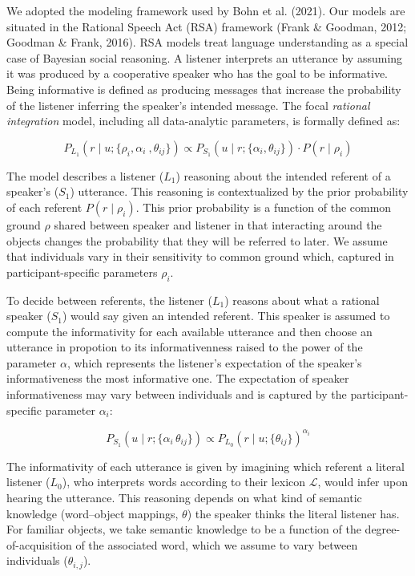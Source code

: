 \documentclass[
  man,mask,floatsintext]{apa6}
\begin{document}
We adopted the modeling framework used by Bohn et al. (2021). Our models are situated in the Rational Speech Act (RSA) framework (Frank \& Goodman, 2012; Goodman \& Frank, 2016). RSA models treat language understanding as a special case of Bayesian social reasoning. A listener interprets an utterance by assuming it was produced by a cooperative speaker who has the goal to be informative. Being informative is defined as producing messages that increase the probability of the listener inferring the speaker's intended message. The focal \emph{rational integration} model, including all data-analytic parameters, is formally defined as:

\begin{equation}
P_{L_1}(r \mid u; \{\rho_i, \alpha_i\ , \theta_{ij}\})\propto P_{S_1}(u \mid r; \{\alpha_i, \theta_{ij}\}) \cdot P(r \mid \rho_i)
\label{eq:rsafull1}
\end{equation}

The model describes a listener (\(L_1\)) reasoning about the intended referent of a speaker's (\(S_1\)) utterance. This reasoning is contextualized by the prior probability of each referent \(P(r \mid \rho_i)\). This prior probability is a function of the common ground \(\rho\) shared between speaker and listener in that interacting around the objects changes the probability that they will be referred to later. We assume that individuals vary in their sensitivity to common ground which, captured in participant-specific parameters \(\rho_i\).

To decide between referents, the listener (\(L_1\)) reasons about what a rational speaker (\(S_1\)) would say given an intended referent. This speaker is assumed to compute the informativity for each available utterance and then choose an utterance in propotion to its informativenness raised to the power of the parameter \(\alpha\), which represents the listener's expectation of the speaker's informativeness the most informative one. The expectation of speaker informativeness may vary between individuals and is captured by the participant-specific parameter \(\alpha_i\):

\begin{equation}
P_{S_1}(u \mid r; \{\alpha_i\, \theta_{ij}\})\propto P_{L_0}(r \mid u; \{\theta_{ij}\}) ^{\alpha_i}
\label{eq:rsafull2}
\end{equation}

The informativity of each utterance is given by imagining which referent a literal listener (\(L_0\)), who interprets words according to their lexicon \(\mathcal{L}\), would infer upon hearing the utterance. This reasoning depends on what kind of semantic knowledge (word--object mappings, \(\theta\)) the speaker thinks the literal listener has. For familiar objects, we take semantic knowledge to be a function of the degree-of-acquisition of the associated word, which we assume to vary between individuals (\(\theta_{i,j}\)).
\end{document}
